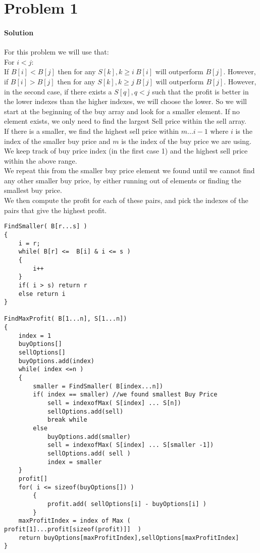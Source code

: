 \documentclass[12pt]{article}
\begin{document}
\maketitle


\section{Problem 1}
\paragraph{Solution}
For this problem we will use that:
\\
For $i < j$:\\
If $B[i] < B[j]$ then for any $S[k], k\geq i ~ B[i]$ will outperform $B[j]$.
However, if $B[i] > B[j]$ then for any $S[k], k \geq j ~ B[j]$ will outperform $B[j]$.
However, in the second case, if there exists a $S[q], q < j$ such that the profit is better in the lower indexes than the higher indexes, we will choose the lower.
So we will start at the beginning of the buy array and look for a smaller element.  If no element exists, we only need to find the largest Sell price within the sell array.\\
If there is a smaller, we find the highest sell price within $m... i-1$ where $i$ is the index of the smaller buy price and $m$ is the index of the buy price we are using.\\
We keep track of buy price index (in the first case 1) and the highest sell price within the above range.\\
We repeat this from the smaller buy price element we found until we cannot find any other smaller buy price, by either running out of elements or finding the smallest buy price.\\
We then compute the profit for each of these pairs, and pick the indexes of the pairs that give the highest profit.

 \begin{lstlisting}
FindSmaller( B[r...s] )
{
	i = r;
	while( B[r] <=  B[i] & i <= s )
	{
		i++
	}
	if( i > s) return r
	else return i
}

FindMaxProfit( B[1...n], S[1...n])
{
	index = 1
	buyOptions[]
	sellOptions[]
	buyOptions.add(index)
	while( index <=n )
	{
		smaller = FindSmaller( B[index...n])
		if( index == smaller) //we found smallest Buy Price
			sell = indexofMax( S[index] ... S[n])
			sellOptions.add(sell)
			break while
		else
			buyOptions.add(smaller)
			sell = indexofMax( S[index] ... S[smaller -1])
			sellOptions.add( sell )
			index = smaller
	}
	profit[]
	for( i <= sizeof(buyOptions[]) )
		{
			profit.add( sellOptions[i] - buyOptions[i] )
		}
	maxProfitIndex = index of Max ( profit[1]...profit[sizeof(profit)]]  )
	return buyOptions[maxProfitIndex],sellOptions[maxProfitIndex]
}
\end{lstlisting}
\end{document}
